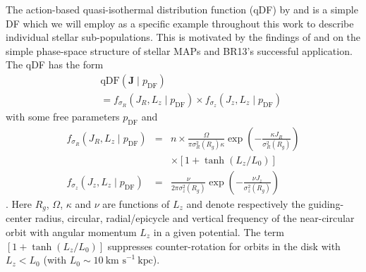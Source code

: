\documentclass[iop,revtex4,numberedappendix,appendixfloats]{emulateapj}
\newcommand{\vect}[1]{\boldsymbol{#1}}
\newcommand{\MAPs}{MAPs}
\begin{document}
The action-based quasi-isothermal distribution function (qDF) by \citet{2010MNRAS.401.2318B} and \citet{2011MNRAS.413.1889B} is a simple DF which we will employ as a specific example throughout this work to describe individual stellar sub-populations. This is motivated by the findings of \citet{2012ApJ...751..131B,2012ApJ...755..115B,2012ApJ...753..148B} and \citet{2013MNRAS.434..652T} on the simple phase-space structure of stellar \MAPs{} and BR13's successful application. The qDF has the form
\begin{eqnarray}
&&\text{qDF}(\vect{J} \mid p_\text{DF}) \nonumber\\
&&= f_{\sigma_R}\left(J_R,L_z \mid p_\text{DF}\right) \times f_{\sigma_z}\left(J_z,L_z \mid p_\text{DF}\right)\label{eq:df_general}\end{eqnarray}
with some free parameters $p_\text{DF}$ and
\begin{eqnarray}
f_{\sigma_R}\left(J_R,L_z \mid p_\text{DF}\right) &=& n \times \frac{\Omega}{\pi\sigma_R^2(R_g) \kappa}\exp\left(-\frac{\kappa J_R}{\sigma_R^2(R_g)} \right) \nonumber\\
&& \times \left[1+\tanh\left(L_z/L_0\right) \right]\\
f_{\sigma_z}\left(J_z,L_z \mid p_\text{DF} \right) &=& \frac{\nu}{2 \pi \sigma_z^2(R_g)} \exp\left( -\frac{\nu J_z}{\sigma_z^2(R_g)} \right)
\end{eqnarray}
\citep{2011MNRAS.413.1889B}. Here $R_g$, $\Omega$, $\kappa$ and $\nu$ are functions of $L_z$ and denote respectively the guiding-center radius, circular, radial/epicycle and vertical frequency of the near-circular orbit with angular momentum $L_z$ in a given potential. The term $\left[1+\tanh\left(L_z/L_0\right) \right]$ suppresses counter-rotation for orbits in the disk with $L_z < L_0$ (with $L_0 \sim 10~\text{km s}^{-1}~ \text{kpc}$).
\end{document}
